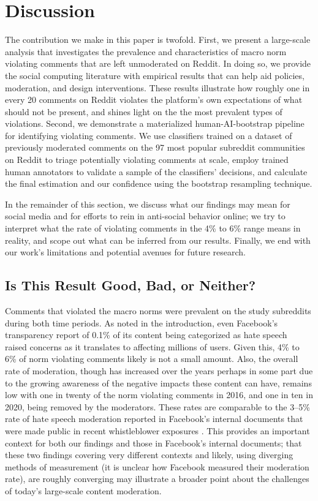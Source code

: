 \section{Discussion}
The contribution we make in this paper is twofold. First, we present a large-scale analysis that investigates the prevalence and characteristics of macro norm violating comments that are left unmoderated on Reddit. In doing so, we provide the social computing literature with empirical results that can help aid policies, moderation, and design interventions. These results illustrate how roughly one in every 20 comments on Reddit violates the platform's own expectations of what should not be present, and shines light on the the most prevalent types of violations. Second, we demonstrate a materialized human-AI-bootstrap pipeline for identifying violating comments. We use classifiers trained on a dataset of previously moderated comments on the 97 most popular subreddit communities on Reddit to triage potentially violating comments at scale, employ trained human annotators to validate a sample of the classifiers’ decisions, and calculate the final estimation and our confidence using the bootstrap resampling technique.

In the remainder of this section, we discuss what our findings may mean for social media and for efforts to rein in anti-social behavior online; we try to interpret what the rate of violating comments in the 4\% to 6\% range means in reality, and scope out what can be inferred from our results. Finally, we end with our work’s limitations and potential avenues for future research. 


\subsection{Is This Result Good, Bad, or Neither?}
Comments that violated the macro norms were prevalent on the study subreddits during both time periods. As noted in the introduction, even Facebook's transparency report of 0.1\% of its content being categorized as hate speech~\cite{58_Culliford, 91_Barrett} raised concerns as it translates to affecting millions of users. Given this, 4\% to 6\% of norm violating comments likely is not a small amount. Also, the overall rate of moderation, though has increased over the years perhaps in some part due to the growing awareness of the negative impacts these content can have, remains low with one in twenty of the norm violating comments in 2016, and one in ten in 2020, being removed by the moderators. These rates are comparable to the 3--5\% rate of hate speech moderation reported in Facebook’s internal documents that were made public in recent whistleblower exposures \cite{facebook_scandal, facebook_scandal_2}. This provides an important context for both our findings and those in Facebook’s internal documents; that these two findings covering very different contexts and likely, using diverging methods of measurement (it is unclear how Facebook measured their moderation rate), are roughly converging may illustrate a broader point about the challenges of today’s large-scale content moderation.

